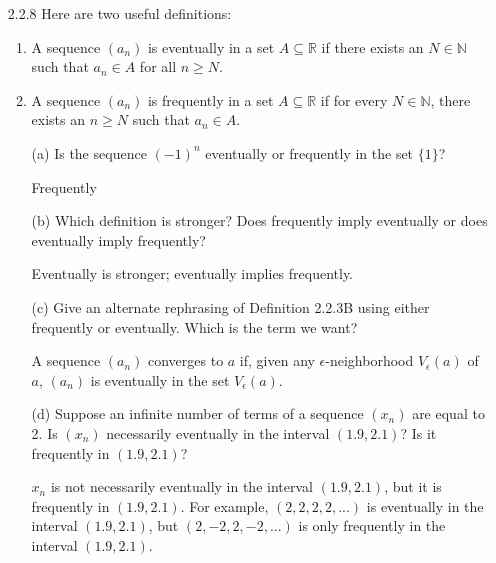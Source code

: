 \documentclass[12pt,letterpaper]{article}
\begin{document}
\begin{itemize}[leftmargin=!,labelindent=5pt]
\begin{itemize}
                A sequence $(a_n)$ “converges to infinity” if, for every positive number $\epsilon$, there exists an $N \in \mathbb{N}$ such that whenever $n \geq N$ it follows that $a_n > \epsilon$.
                
                \begin{proof}
                    Let $\epsilon > 0$ be arbitrary. Choose $N \in \mathbb{N}$ with $N > \epsilon^2$. To verify let $n \geq N$ which means $\sqrt{n} > \sqrt{\epsilon^2} = \epsilon$ as desired.
                \end{proof}
            \item [(b)] What does your definition in (a) say about the particular sequence $(1,0,2,0,3,0,4,0,5,0,...)$?
            
            It does not converge to infinity.
        \end{itemize}
    \item [2.2.8] Here are two useful definitions:
        \begin{enumerate}
            \item A sequence $(a_n)$ is eventually in a set $A \subseteq \mathbb{R}$ if there exists an $N \in \mathbb{N}$ such that $a_n \in A$ for all $n \geq N$.
            \item A sequence $(a_n)$ is frequently in a set $A \subseteq \mathbb{R}$ if for every $N \in \mathbb{N}$, there exists an $n \geq N$ such that $a_n \in A$.
        \end{enumerate}
        \begin{itemize}
            \item [(a)] Is the sequence $(-1)^n$ eventually or frequently in the set $\{1\}$?
            
            Frequently
            \item [(b)] Which definition is stronger? Does frequently imply eventually or does eventually imply frequently?
            
            Eventually is stronger; eventually implies frequently.
            \item [(c)] Give an alternate rephrasing of Definition 2.2.3B using either frequently or eventually. Which is the term we want?
            
            A sequence $(a_n)$ converges to $a$ if, given any $\epsilon$-neighborhood $V_\epsilon(a)$ of $a$, $(a_n)$ is eventually in the set $V_\epsilon(a)$.
            \item [(d)] Suppose an infinite number of terms of a sequence $(x_n)$ are equal to 2. Is $(x_n)$ necessarily eventually in the interval $(1.9, 2.1)$? Is it frequently in $(1.9, 2.1)$?
            
            $x_n$ is not necessarily eventually in the interval $(1.9, 2.1)$, but it is frequently in $(1.9, 2.1)$. 
            For example, $(2,2,2,2,...)$ is eventually in the interval $(1.9, 2.1)$, but $(2,-2,2,-2,...)$ is only frequently in the interval $(1.9, 2.1)$.
        \end{itemize}
    
\end{itemize}
\end{document}
